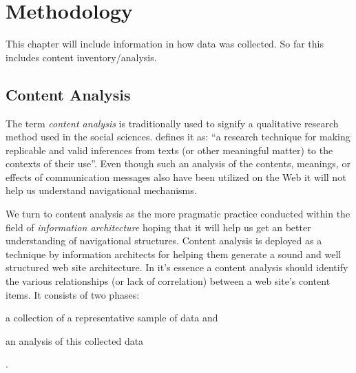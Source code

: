 \chapter{Methodology}
\label{chapter:methodology}

This chapter will include information in how data was collected. So far this
includes content inventory/analysis.

\section{Content Analysis}

The term \emph{content analysis} is traditionally used to signify a
qualitative research method used in the social sciences.
\citet[p.~18]{krippendorff03} defines it as:
``a research technique for making replicable and valid
inferences from texts (or other meaningful matter) to the contexts of their
use''. Even though such an analysis of the contents, meanings, or effects of
communication messages also have been utilized on the Web \citep{weare00}
it will not help us understand navigational mechanisms.

We turn to content analysis as the more pragmatic practice conducted within
the field of \emph{information architecture}%
 hoping that it will help us get an better understanding of navigational
structures.
Content analysis is deployed as a technique by information architects for
helping them generate a sound and well structured web site architecture.
In it's essence a content analysis should identify the various
relationships (or lack of correlation) between a web site's content items.
It consists of two phases:
\begin{inparaenum}[(i)]
  \item a collection of a representative sample of data and
  \item an analysis of this collected data
\end{inparaenum}
\citep[pp.~241--243]{morville06}.

